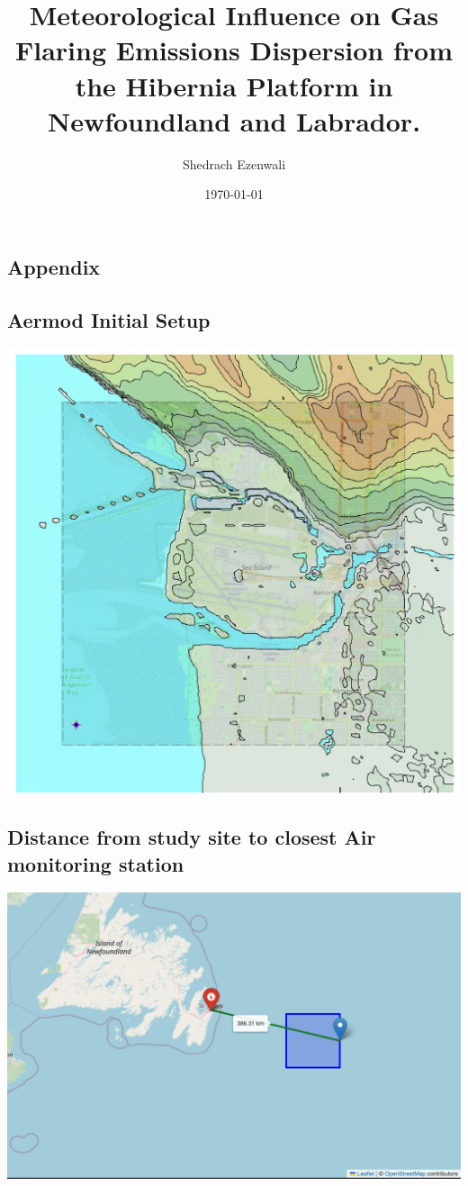 \documentclass{article}
\title{\textbf{Meteorological Influence on Gas Flaring Emissions Dispersion from the Hibernia Platform in Newfoundland and Labrador.}}
\author{Shedrach Ezenwali}
\date{\today}
\begin{document}
\maketitle


% 

\newpage


\begin{appendix}
    \centering 
    \section*{Appendix} 
    \subsection*{Aermod Initial Setup} 
    \includegraphics[width=1\textwidth]{./assets/aermod.png} 

    \subsection*{Distance from study site to closest Air monitoring station} 
    \includegraphics[width=1\textwidth]{./assets/study_site.png}
\end{appendix}
    
\end{document}
